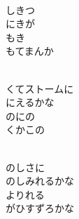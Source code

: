 \documentclass[10pt,b5j]{tarticle} %
\begin{document}
\vspace{1.5em} %
\newcommand{\linespace}{0.5em} %
\newcommand{\blocksize}{0.5\hsize} %
\newcommand{\itemmargin}{3em} %
\begin{enumerate} %
    \setlength{\itemindent}{\itemmargin} %
    \begin{minipage}[c]{\blocksize}
    
        \vspace{\linespace}
        \item~\\
        しきつ\\
        にきが\\
        もき\\
        もてまんか
        
    \end{minipage}
    \begin{minipage}[c]{\blocksize}
        
        \vspace{\linespace}
        \item~\\
        くてストームに\\
        にえるかな\\
        のにの\\
        くかこの
        
    \end{minipage}
    \begin{minipage}[c]{\blocksize}
        
        \vspace{\linespace}
        \item~\\
        のしさに\\
        のしみれるかな\\
        よりれる\\
        がひすずろかな
        
    \end{minipage}
    \begin{minipage}[c]{\blocksize}
        

\end{minipage}
\end{enumerate}
\end{document}
